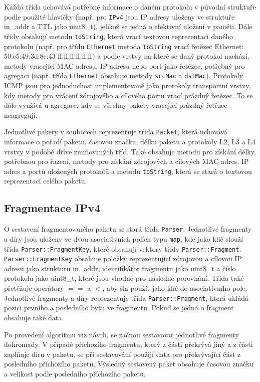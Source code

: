 \documentclass[11pt, a4paper]{article}
\begin{document}
Každá třída uchovává potřebné informace o daném protokolu v původní struktuře podle použité hlavičky (např. pro \texttt{IPv4} jsou IP adresy uloženy ve struktuře in\_addr a TTL jako uint8\_t), jelikož se jedná o efektivní uložení v paměti. Dále třídy obsahují metodu \texttt{toString}, která vrací textovou reprezentaci daného protokolu (např. pro třídu \texttt{Ethernet} metoda \texttt{toString} vrací řetězec Ethernet: 50:e5:49:3d:8c:43 ff:ff:ff:ff:ff:ff) a podle vrstvy na které se daný protokol nachází, metody vracející MAC adresu, IP adresu nebo port jako řetězec, potřebný pro agregaci (např. třída \texttt{Ethernet} obsahuje metody \texttt{srcMac} a \texttt{dstMac}). Protokoly ICMP jsou pro jednoduchost implementované jako protokoly transportní vrstvy, kdy metody pro vrácení zdrojového a cílového portu vrací prázdný řetězec. To se dále využívá u agregace, kdy se všechny pakety vracející prázdný řetězec neagregují. 

Jednotlivé pakety v souborech reprezentuje třída \texttt{Packet}, která uchovává informace o pořadí paketu, časovou značku, délku paketu a protokoly L2, L3 a L4 vrstvy v podobě dříve zmiňovaných tříd. Také obsahuje metodu pro získání délky, potřebnou pro řazení, metody pro získání zdrojových a cílových MAC adres, IP adres a portů uložených protokolů a metodu \texttt{toString}, která se stará o textovou reprezentaci celého paketu.

\subsection{Fragmentace IPv4}

O sestavení fragmentovaného paketu se stará třída \texttt{Parser}. Jednotlivé fragmenty a díry jsou uloženy ve dvou asociativních polích typu \texttt{map}, kde jako klíč slouží třída \texttt{Parser::FragmentKey}, které obsahují vektory třídy \texttt{Parser::Fragment}. \texttt{Parser::FragmentKey} obsahuje položky reprezentující zdrojovou a cílovou IP adresu jako strukturu in\_addr, identifikátor fragmentu jako uint8\_t a číslo protokolu jako uint8\_t, které jsou vhodné pro následné porovnání. Třída také přetěžuje operátory $==$ a $<$, aby šla použít jako klíč do asociativního pole. Jednotlivé fragmenty a díry reprezentuje třída \texttt{Parser::Fragment}, která ukládá pozici prvního a posledního bytu ve fragmentu. Pokud se jedná o fragment obsahuje také data.

Po provedení algoritmu viz návrh, se začnou sestavovat jednotlivé fragmenty dohromady. V pří\-pa\-dě pří\-cho\-zí\-ho fragmentu, který z části překrývá jiný a z části zaplňuje díru v paketu, se při sestavování použijí data pro překrývající část z pos\-led\-ní\-ho pří\-cho\-zí\-ho paketu. Výsledný sestavený paket obsahuje časovou značku a velikost podle posledního příchozího paketu.
\end{document}
